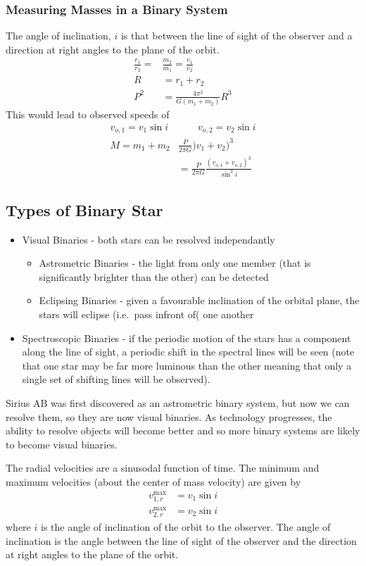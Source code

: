 \documentclass[british]{article}
\begin{document}
\subsubsection{Measuring Masses in a Binary System}
The angle of inclination, $i$ is that between the line of sight of the observer and a direction at right angles to the plane of the orbit.
\begin{align*}
	\frac{r_1}{r_2} = &\frac{m_2}{m_1} = \frac{v_1}{v_2} \\
	R &= r_1 + r_2 \\
	P^2 &= \frac{4\pi^2}{G(m_1+m_2)}R^3
\end{align*}
This would lead to observed speeds of
\begin{align*}
	v_{o,1} = v_1 \sin i &\qquad v_{o,2} = v_2 \sin i \\
	M = m_1 + m_2 & \frac{P}{2\pi G})v_1+v_2)^3 \\
	&= \frac{P}{2\pi G}\frac{(v_{o,1} + v_{o,2})^3}{\sin^3 i}
\end{align*}
\subsection{Types of Binary Star}
\begin{itemize}
	\item Visual Binaries - both stars can be resolved independantly
		\begin{itemize}
			\item Astrometric Binaries - the light from only one member (that is significantly brighter than the other) can be detected
			\item Eclipsing Binaries - given a favourable inclination of the orbital plane, the stars will eclipse (i.e.\ pass infront of( one another
		\end{itemize}
	\item Spectroscopic Binaries - if the periodic motion of the stars has a component along the line of sight, a periodic shift in the spectral lines will be seen (note that one star may be far more luminous than the other meaning that only a single set of shifting lines will be observed).
\end{itemize}
Sirius AB was first discovered as an astrometric binary system, but now we can resolve them, so they are now visual binaries. As technology progresses, the ability to resolve objects will become better and so more binary systems are likely to become visual binaries.

The radial velocities are a sinusodal function of time. The minimum and maximum velocities (about the center of mass velocity) are given by
\begin{align*}
	v^{\text{max}}_{1,r} &=v_1\sin i \\
	v^{\text{max}}_{2,r} &=v_2\sin i 
\end{align*}
where $i$ is the angle of inclination of the orbit to the observer. The angle of inclination is the angle between the line of sight of the observer and the direction at right angles to the plane of the orbit.
\end{document}
